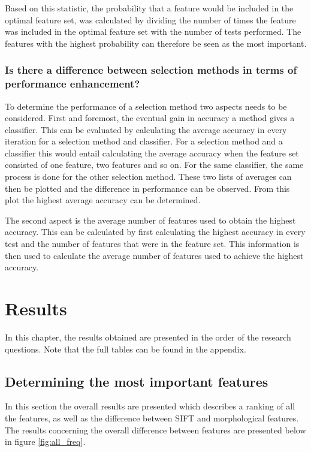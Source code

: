 \documentclass{kththesis}
\begin{document}
Based on this statistic, the probability that a feature would be included in the optimal feature set, was calculated by dividing the number of times the feature was included in the optimal feature set with the number of tests performed. The features with the highest probability can therefore be seen as the most important.


\subsection{Is there a difference between selection methods in terms of performance enhancement?}

To determine the performance of a selection method two aspects needs to be considered. First and foremost, the eventual gain in accuracy a method gives a classifier. This can be evaluated by calculating the average accuracy in every iteration for a selection method and classifier. For a selection method and a classifier this would entail calculating the average accuracy when the feature set consisted of one feature, two features and so on. For the same classifier, the same process is done for the other selection method. These two lists of averages can then be plotted and the difference in performance can be observed. From this plot the highest average accuracy can be determined. 


The second aspect is the average number of features used to obtain the highest accuracy. This can be calculated by first calculating the highest accuracy in every test and the number of features that were in the feature set. This information is then used to calculate the average number of features used to achieve the highest accuracy. 


\chapter{Results}

In this chapter, the results obtained are presented in the order of the research questions. Note that the full tables can be found in the appendix.


\section{Determining the most important features}

In this section the overall results are presented which describes a ranking of all the features, as well as the difference between SIFT and morphological features. The results concerning the overall difference between features are presented below in figure \ref{fig:all_freq}.
\end{document}

